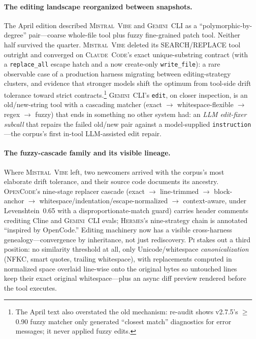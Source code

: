 \documentclass[11pt,a4paper]{article}
\newcommand{\clcode}{\textsc{Claude~Code}\xspace}
\newcommand{\vibe}{\textsc{Mistral~Vibe}\xspace}
\newcommand{\gemini}{\textsc{Gemini~CLI}\xspace}
\newcommand{\hrm}{\textsc{Hermes}\xspace}
\newcommand{\pib}{\textsc{Pi}\xspace}
\newcommand{\ocd}{\textsc{OpenCode}\xspace}
\begin{document}
\paragraph{The editing landscape reorganized between snapshots.}
The April edition described \vibe{} and \gemini{} as a ``polymorphic-by-degree'' pair---coarse whole-file tool plus fuzzy fine-grained patch tool.
Neither half survived the quarter.
\vibe{} deleted its SEARCH/REPLACE tool outright and converged on \clcode{}'s exact unique-substring contract (with a \texttt{replace\_all} escape hatch and a now create-only \texttt{write\_file}): a rare observable case of a production harness migrating between editing-strategy clusters, and evidence that stronger models shift the optimum from tool-side drift tolerance toward strict contracts.\footnote{The April text also overstated the old mechanism: re-audit shows v2.7.5's $\geq$0.90 fuzzy matcher only generated ``closest match'' diagnostics for error messages; it never applied fuzzy edits.}
\gemini{}'s \texttt{edit}, on closer inspection, is an old/new-string tool with a cascading matcher (exact $\to$ whitespace-flexible $\to$ regex $\to$ fuzzy) that ends in something no other system had: an \emph{LLM edit-fixer subcall} that repairs the failed old/new pair against a model-supplied \texttt{instruction}---the corpus's first in-tool LLM-assisted edit repair.

\paragraph{The fuzzy-cascade family and its visible lineage.}
Where \vibe{} left, two newcomers arrived with the corpus's most elaborate drift tolerance, and their source code documents its ancestry.
\ocd{}'s nine-stage replacer cascade (exact $\to$ line-trimmed $\to$ block-anchor $\to$ whitespace/indentation/escape-normalized $\to$ context-aware, under Levenshtein~0.65 with a disproportionate-match guard) carries header comments crediting Cline and \gemini{} evals; \hrm{}'s nine-strategy chain is annotated ``inspired by OpenCode.''
Editing machinery now has a visible cross-harness genealogy---convergence by inheritance, not just rediscovery.
\pib{} stakes out a third position: no similarity threshold at all, only Unicode/whitespace \emph{canonicalization} (NFKC, smart quotes, trailing whitespace), with replacements computed in normalized space overlaid line-wise onto the original bytes so untouched lines keep their exact original whitespace---plus an async diff preview rendered before the tool executes.
\end{document}
